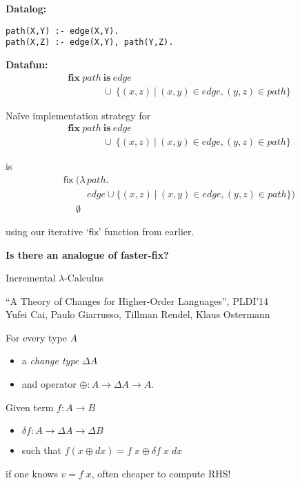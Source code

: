 \documentclass{beamer}
\newcommand{\mb}{\mathbf}
\newcommand{\setfor}[2]{\{#1 ~|~ #2\}}
\begin{document}
\begin{frame}[fragile]
  \Large\textbf{Datalog:}
\begin{verbatim}
path(X,Y) :- edge(X,Y).
path(X,Z) :- edge(X,Y), path(Y,Z).
\end{verbatim}
\vspace{0.4cm}

\Large\textbf{Datafun:}
  \[
  \begin{array}{l}
    \mb{fix}~path~\mb{is}~edge\\
    \phantom{\mb{fix}~path}\,\cup~\setfor{(x,z)}{(x,y) \in edge, (y,z) \in path}
  \end{array}
  \]
\end{frame}


\begin{frame}
  \Large
  Na\"ive implementation strategy for
  \[
  \begin{array}{l}
    \mb{fix}~path~\mb{is}~edge\\
    \phantom{\mb{fix}~path}\,\cup~\setfor{(x,z)}{(x,y) \in edge, (y,z) \in path}
  \end{array}
  \]

  is
  \[
  \begin{array}{l}
    \textsf{fix}\; (\lambda\, path.\\
    \phantom{\textsf{fix}\; (\lambda\, } edge \cup \setfor{(x,z)}{(x,y) \in edge, (y,z) \in path})
    \\ \phantom{\textsf{fix}\;}\emptyset
  \end{array}
  \]

  using our iterative `$\mathsf{fix}$' function from earlier.
  \vspace{1em}

  \textbf{Is there an analogue of {\normalfont faster-fix}?}
\end{frame}


\begin{frame}
  \Huge \centering
  Incremental $\lambda$-Calculus\vspace{0.5cm}

  \large ``A Theory of Changes for Higher-Order Languages'', PLDI'14\\Yufei
  Cai, Paulo Giarrusso, Tillman Rendel, Klaus Ostermann
\end{frame}

\begin{frame}
  \Large For every type $A$
  \begin{itemize}
  \item a \emph{change type} $\Delta A$ 
  \item and operator $\oplus : A \to \Delta A \to A$.
  \end{itemize}
  \vspace{0.5cm}

  Given term $f : A \to B$\\
  \begin{itemize}
  \item $\delta f : A \to \Delta A \to \Delta B$
  \item such that $f(x \oplus dx) = f\; x \oplus \delta f\; x\; dx$
  \end{itemize}
  if one knows $v = f\; x$, often cheaper to compute RHS!
\end{frame}
\end{document}
